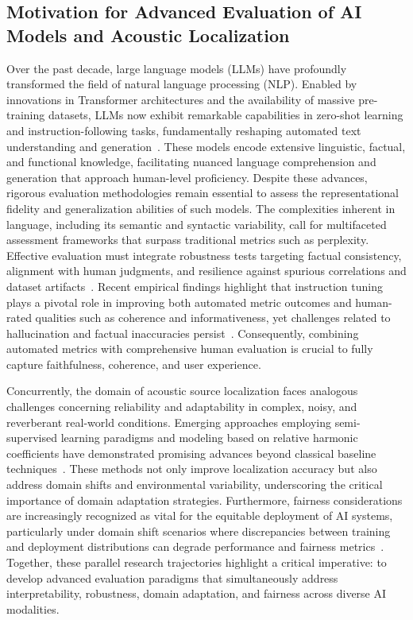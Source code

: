 \documentclass[sigconf]{acmart}
\begin{document}
\subsection{Motivation for Advanced Evaluation of AI Models and Acoustic Localization}

Over the past decade, large language models (LLMs) have profoundly transformed the field of natural language processing (NLP). Enabled by innovations in Transformer architectures and the availability of massive pre-training datasets, LLMs now exhibit remarkable capabilities in zero-shot learning and instruction-following tasks, fundamentally reshaping automated text understanding and generation~\cite{ref10}. These models encode extensive linguistic, factual, and functional knowledge, facilitating nuanced language comprehension and generation that approach human-level proficiency. Despite these advances, rigorous evaluation methodologies remain essential to assess the representational fidelity and generalization abilities of such models. The complexities inherent in language, including its semantic and syntactic variability, call for multifaceted assessment frameworks that surpass traditional metrics such as perplexity. Effective evaluation must integrate robustness tests targeting factual consistency, alignment with human judgments, and resilience against spurious correlations and dataset artifacts~\cite{ref1,ref3}. Recent empirical findings highlight that instruction tuning plays a pivotal role in improving both automated metric outcomes and human-rated qualities such as coherence and informativeness, yet challenges related to hallucination and factual inaccuracies persist~\cite{ref1}. Consequently, combining automated metrics with comprehensive human evaluation is crucial to fully capture faithfulness, coherence, and user experience.

Concurrently, the domain of acoustic source localization faces analogous challenges concerning reliability and adaptability in complex, noisy, and reverberant real-world conditions. Emerging approaches employing semi-supervised learning paradigms and modeling based on relative harmonic coefficients have demonstrated promising advances beyond classical baseline techniques~\cite{ref2,ref3,ref26}. These methods not only improve localization accuracy but also address domain shifts and environmental variability, underscoring the critical importance of domain adaptation strategies. Furthermore, fairness considerations are increasingly recognized as vital for the equitable deployment of AI systems, particularly under domain shift scenarios where discrepancies between training and deployment distributions can degrade performance and fairness metrics~\cite{ref26}. Together, these parallel research trajectories highlight a critical imperative: to develop advanced evaluation paradigms that simultaneously address interpretability, robustness, domain adaptation, and fairness across diverse AI modalities.
\end{document}
